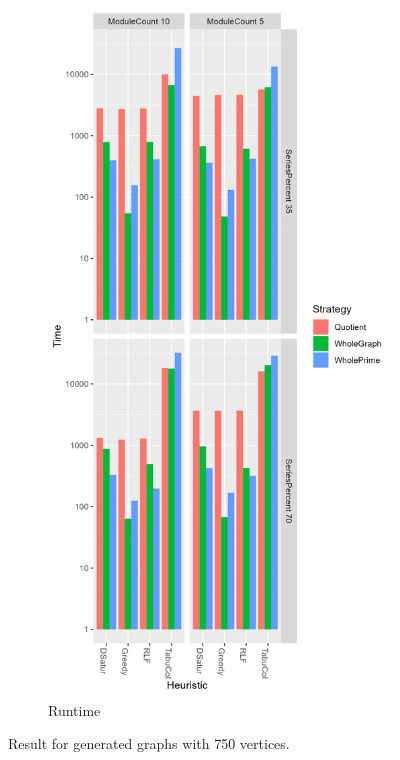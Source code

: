 \documentclass[a4paper]{article}
\begin{document}
\begin{figure}[p]
\begin{subfigure}{.4\paperwidth}
    \end{subfigure}%
    \begin{subfigure}{.4\paperwidth}
        \includegraphics[width=\columnwidth]{Tables/750Time.png}
      \caption{Runtime}
      \label{fig:750t}
    \end{subfigure}
\caption{Result for generated graphs with 750 vertices. \facfigdesc }
\label{fig:750}
\end{figure}
\end{document}
